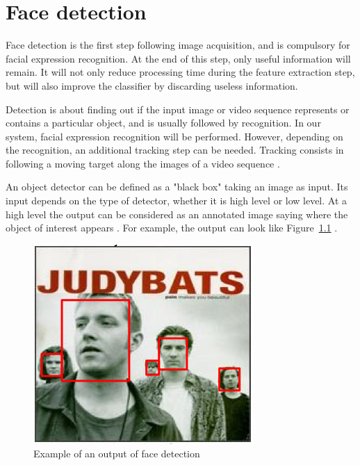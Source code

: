 \chapter{Face detection}

\noindent Face detection is the first step following image acquisition, and is compulsory for facial expression recognition. At the end of this step, only useful information will remain. It will not only reduce processing time during the feature extraction step, but will also improve the classifier by discarding useless information.
\newline

\noindent Detection is about finding out if the input image or video sequence represents or contains a particular object, and is usually followed by recognition. In our system, facial expression recognition will be performed. However, depending on the recognition, an additional tracking step can be needed. Tracking consists in following a moving target along the images of a video sequence \cite{DIN08}.
\newline

\noindent An object detector can be defined as a "black box" taking an image as input. Its input depends on the type of detector, whether it is high level or low level. At a high level the output can be considered as an annotated image saying where the object of interest appears \cite{DIN08}. For example, the output can look like Figure~\ref{output_example_face_detection} \cite{DIN08}.
\newline

\begin{figure}[!h]
\begin{center}
\noindent \includegraphics[scale=0.7]{figures/output_example_face_detection} 
\newline
\caption{Example of an output of face detection \cite{DIN08}}
\label{output_example_face_detection}
\end{center} 
\end{figure}

